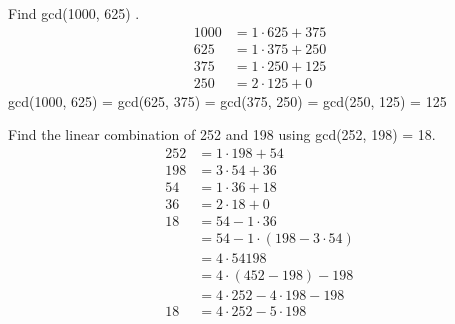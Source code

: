 \documentclass[12pt]{article}
\begin{document}
\begin{example} Find gcd(1000, 625) . 
$$ \begin{aligned} 
1000 &= 1 \cdot 625 + 375 \\ 
625 &= 1 \cdot 375 + 250 \\ 
375 &= 1 \cdot 250 + 125 \\ 
250 &= 2 \cdot 125 + 0 \end{aligned} $$ gcd(1000, 625) = gcd(625, 375) = gcd(375, 250) = gcd(250, 125) = 125 \end{example} 

\begin{example} Find the linear combination of 252 and 198 using gcd(252, 198) = 18. 
$$\begin{aligned} 
252 &= 1 \cdot 198 + 54 \\ 
198 &= 3 \cdot 54 + 36 \\ 
54 &= 1 \cdot 36 + 18 \\ 
36 &= 2 \cdot 18 + 0 \\ 
18 &= 54 - 1 \cdot 36 \\ 
&= 54 - 1 \cdot (198 - 3 \cdot 54) \\ 
&= 4 \cdot 54 198 \\ 
&= 4 \cdot (452 - 198) - 198 \\ 
&= 4 \cdot 252 - 4 \cdot 198 - 198 \\ 
18 &= 4 \cdot 252 - 5 \cdot 198 \end{aligned} $$ \end{example}
\end{document}
